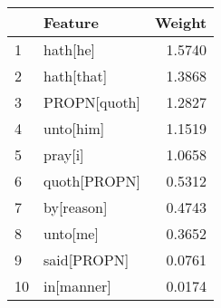 \begin{tabular}{llr}
\toprule
{} &       Feature &  Weight \\
\midrule
1  &      hath[he] &  1.5740 \\
2  &    hath[that] &  1.3868 \\
3  &  PROPN[quoth] &  1.2827 \\
4  &     unto[him] &  1.1519 \\
5  &       pray[i] &  1.0658 \\
6  &  quoth[PROPN] &  0.5312 \\
7  &    by[reason] &  0.4743 \\
8  &      unto[me] &  0.3652 \\
9  &   said[PROPN] &  0.0761 \\
10 &    in[manner] &  0.0174 \\
\bottomrule
\end{tabular}
